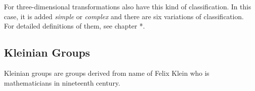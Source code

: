 For three-dimensional transformations also have this kind of
classification.
In this case, it is added \textit{simple} or \textit{complex} and
there are six variations of classification.
For detailed definitions of them, see chapter *.

\subsection{Kleinian Groups}

Kleinian groups are groups derived from name of Felix Klein who is
mathematicians in nineteenth century.
